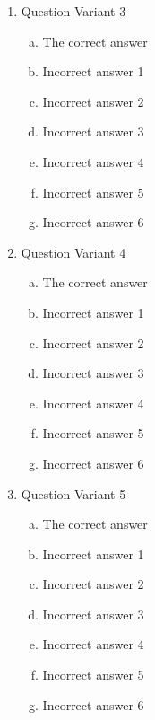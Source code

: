 \documentclass{article}
\begin{document}
\begin{enumerate}
\item Question Variant 3
  \begin{enumerate}[a)]
  \item The correct answer
  \item Incorrect answer 1
  \item Incorrect answer 2
  \item Incorrect answer 3
  \item Incorrect answer 4
  \item Incorrect answer 5
  \item Incorrect answer 6
  \end{enumerate}

\item Question Variant 4
  \begin{enumerate}[a)]
  \item The correct answer
  \item Incorrect answer 1
  \item Incorrect answer 2
  \item Incorrect answer 3
  \item Incorrect answer 4
  \item Incorrect answer 5
  \item Incorrect answer 6
  \end{enumerate}

\item Question Variant 5
  \begin{enumerate}[a)]
  \item The correct answer
  \item Incorrect answer 1
  \item Incorrect answer 2
  \item Incorrect answer 3
  \item Incorrect answer 4
  \item Incorrect answer 5
  \item Incorrect answer 6
  \end{enumerate}


\end{enumerate}
\end{document}
